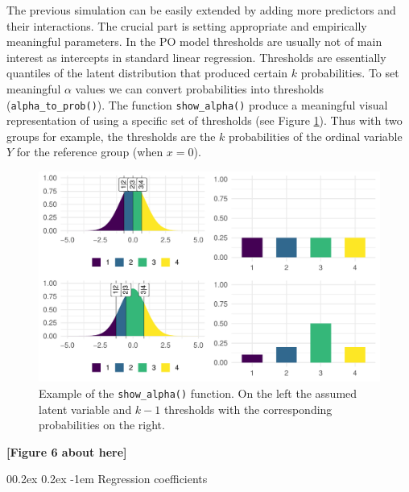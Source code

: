 \documentclass[
  man,floatsintext]{apa6}
\makeatletter
\let\oldparagraph\paragraph
\renewcommand{\paragraph}[1]{\oldparagraph{#1}\mbox{}}
\renewcommand{\paragraph}{\@startsection{paragraph}{4}{\parindent}%
  {0\baselineskip \@plus 0.2ex \@minus 0.2ex}%
  {-1em}%
  {\normalfont\normalsize\bfseries\itshape\typesectitle}}
\makeatother
\begin{document}
The previous simulation can be easily extended by adding more predictors and their interactions. The crucial part is setting appropriate and empirically meaningful parameters. In the PO model thresholds are usually not of main interest as intercepts in standard linear regression. Thresholds are essentially quantiles of the latent distribution that produced certain \(k\) probabilities. To set meaningful \(\alpha\) values we can convert probabilities into thresholds (\texttt{alpha\_to\_prob()}). The function \texttt{show\_alpha()} produce a meaningful visual representation of using a specific set of thresholds (see Figure \ref{fig:fig-show-th-example}). Thus with two groups for example, the thresholds are the \(k\) probabilities of the ordinal variable \(Y\) for the reference group (when \(x = 0\)).

\scriptsize

\begin{figure}

{\centering \includegraphics[width=1\linewidth]{paper_files/figure-latex/fig-show-th-example-1} 

}

\caption{Example of the \texttt{show\_alpha()} function. On the left the assumed latent variable and \(k - 1\) thresholds with the corresponding probabilities on the right.}\label{fig:fig-show-th-example}
\end{figure}

\begin{center}\textbf{[Figure 6 about here]} \end{center}

\normalsize

\paragraph{Regression coefficients}\label{regression-coefficients}
\end{document}
